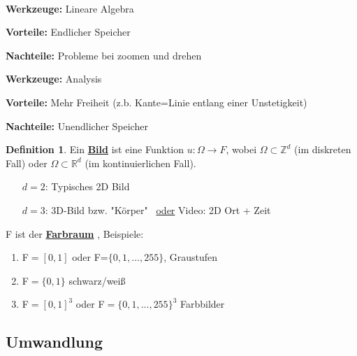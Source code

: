 \documentclass[ngerman]{article}
\theoremstyle{plain}
\theoremstyle{definition}
\newtheorem*{definition*}{Definition}
\numberwithin{equation}{section}
\newcommand{\mim}[1] {
\underline{\textbf{#1\index{#1}}}
}
\newcommand{\pa}[1] {
    \par{\textbf{#1}}
}
\begin{document}
        \ \\

        \begin{minipage}[t]{0.47\linewidth}
            \pa{Werkzeuge:} Lineare Algebra
            \pa{Vorteile:} Endlicher Speicher
            \pa{Nachteile:} Probleme bei zoomen und drehen
        \end{minipage}
        \hfill\vrule\hfill
        \begin{minipage}[t]{0.47\linewidth}
            \pa{Werkzeuge:} Analysis
            \pa{Vorteile:} Mehr Freiheit (z.b. Kante=Linie entlang einer Unstetigkeit)
            \pa{Nachteile:} Unendlicher Speicher
        \end{minipage}

        \begin{definition*}
            Ein \mim{Bild} ist eine Funktion $u: \Omega \to F$, wobei $\Omega \subset \mathbb Z^d$ (im diskreten Fall) oder $\Omega \subset \mathbb R^d$ (im kontinuierlichen Fall).
            \begin{enumerate}
                \item[$d=2$:] Typisches 2D Bild
                \item[$d=3$:] 3D-Bild bzw. "Körper" \ \underline{oder} Video: 2D Ort + Zeit
            \end{enumerate}
            F ist der \mim{Farbraum}, Beispiele:
            \begin{enumerate}[label=\textbullet]
                \item F$=[0,1]$ oder F=$\{0,1,..., 255\}$, Graustufen
                \item F$=\{0,1\}$ schwarz/weiß
                \item F$=[0,1]^3$ oder F$=\{0,1,...,255\}^3$ Farbbilder
            \end{enumerate}
        \end{definition*}
    \subsection{Umwandlung}
\end{document}
